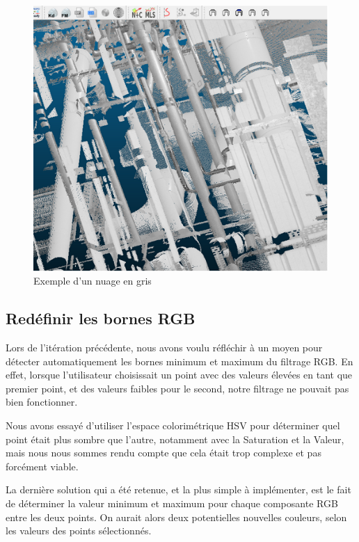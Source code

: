 \documentclass[12pt,titlepage,french]{article}
\begin{document}
\begin{figure}[H]
 \caption{\label{} Exemple d'un nuage en gris}
 \begin{center}
 \includegraphics[width=1\textwidth]{./img/grey_cloud.PNG}
  \end{center}
\end{figure}

\subsection{Redéfinir les bornes RGB}

Lors de l'itération précédente, nous avons voulu réfléchir à un moyen pour détecter automatiquement les bornes minimum et maximum du filtrage RGB. En effet, lorsque l'utilisateur choisissait un point avec des valeurs élevées en tant que premier point, et des valeurs faibles pour le second, notre filtrage ne pouvait pas bien fonctionner. \newline

Nous avons essayé d'utiliser l'espace colorimétrique HSV pour déterminer quel point était plus sombre que l'autre, notamment avec la Saturation et la Valeur, mais nous nous sommes rendu compte que cela était trop complexe et pas forcément viable. \newline

La dernière solution qui a été retenue, et la plus simple à implémenter, est le fait de déterminer la valeur minimum et maximum pour chaque composante RGB entre les deux points. On aurait alors deux potentielles nouvelles couleurs, selon les valeurs des points sélectionnés.
\end{document}
